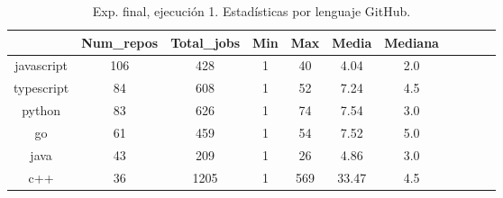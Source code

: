 \begin{table}[h]
  \centering
  \caption{Exp. final, ejecución 1. Estadísticas por lenguaje GitHub.}
  \label{tab:tabla_f1_4}

\begin{footnotesize}
\renewcommand{\arraystretch}{1.5} %
\begin{tabular}{ccccccccccc}
  \hline
  {} &  Num\_repos &  Total\_jobs &  Min &  Max &  Media &  Mediana \\
  \hline
  javascript       &        106 &         428 &    1 &   40 &   4.04 &      2.0 \\
  typescript       &         84 &         608 &    1 &   52 &   7.24 &      4.5 \\
  python           &         83 &         626 &    1 &   74 &   7.54 &      3.0 \\
  go               &         61 &         459 &    1 &   54 &   7.52 &      5.0 \\
  java             &         43 &         209 &    1 &   26 &   4.86 &      3.0 \\
  c++              &         36 &        1205 &    1 &  569 &  33.47 &      4.5 \\

\end{tabular}
\end{footnotesize}
\end{table}
